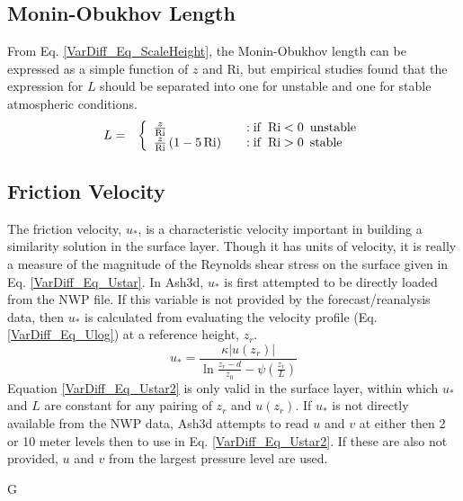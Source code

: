 \subsection{Monin-Obukhov Length}
From Eq. \ref{VarDiff_Eq_ScaleHeight}, the Monin-Obukhov length can be expressed as
a simple function of $z$ and $\mathrm{Ri}$, but empirical studies found that
the expression for $L$ should be separated into one for unstable and one for stable 
atmospheric conditions.
\begin{eqnarray}\label{VarDiff_Eq_MonL}
L &=& \left\{ \begin{array} {l@{\quad \quad}l}
 \frac{z}{\mathrm{Ri}}                 &:  \mathrm{if}\,\,\, \mathrm{Ri}<0 \,\,\, \mathrm{unstable} \\
\frac{z}{\mathrm{Ri}}\left(1-5\,\mathrm{Ri}\right)  &:  \mathrm{if}\,\,\, \mathrm{Ri}>0 \,\,\, \mathrm{stable}
\end{array}
\right.
\end{eqnarray}


\subsection{Friction Velocity}
The friction velocity, $u_*$, is a characteristic velocity important in building a similarity
solution in the surface layer. Though it has units of velocity, it is really a measure
of the magnitude of the Reynolds shear stress on the surface given in Eq. \ref{VarDiff_Eq_Ustar}.
In Ash3d, $u_*$ is first attempted to be directly loaded from the NWP file. If this variable is not
provided by the forecast/reanalysis data, then $u_*$ is calculated from evaluating the velocity
profile (Eq. \ref{VarDiff_Eq_Ulog}) at a reference height, $z_r$.
\begin{equation}\label{VarDiff_Eq_Ustar2}
u_* = \frac{\kappa |u(z_r)|}{\ln \frac{z_r-d}{z_0} - \psi(\frac{z_r}{L})}
\end{equation}
Equation \ref{VarDiff_Eq_Ustar2} is only valid in the surface layer, within which
$u_*$ and $L$ are constant for any pairing of $z_r$ and $u(z_r)$. If $u_*$ is not directly available
from the NWP data, Ash3d attempts to read $u$ and $v$ at either then 2 or 10 meter levels then to
use in Eq. \ref{VarDiff_Eq_Ustar2}. If these are also not provided, $u$ and $v$ from the largest
pressure level are used.


G%
